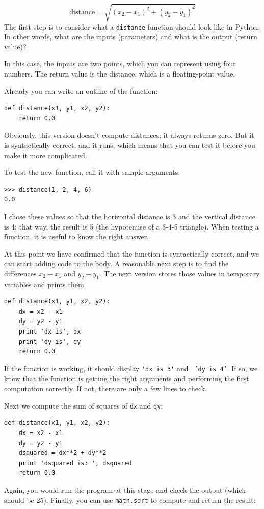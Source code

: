 \documentclass[10pt]{book}
\begin{document}
\begin{displaymath}
\mathrm{distance} = \sqrt{(x_2 - x_1)^2 + (y_2 - y_1)^2}
\end{displaymath}
%
The first step is to consider what a {\tt distance} function should
look like in Python.  In other words, what are the inputs (parameters)
and what is the output (return value)?

In this case, the inputs are two points, which you can represent
using four numbers.  The return value is the distance, which is
a floating-point value.

Already you can write an outline of the function:

\begin{verbatim}
def distance(x1, y1, x2, y2):
    return 0.0
\end{verbatim}
%
Obviously, this version doesn't compute distances; it always returns
zero.  But it is syntactically correct, and it runs, which means that
you can test it before you make it more complicated.

To test the new function, call it with sample arguments:

\begin{verbatim}
>>> distance(1, 2, 4, 6)
0.0
\end{verbatim}
%
I chose these values so that the horizontal distance is 3 and the
vertical distance is 4; that way, the result is 5
(the hypotenuse of a 3-4-5 triangle). When testing a function, it is
useful to know the right answer.

At this point we have confirmed that the function is syntactically
correct, and we can start adding code to the body.
A reasonable next step is to find the differences
$x_2 - x_1$ and $y_2 - y_1$.  The next version stores those values in
temporary variables and prints them.

\begin{verbatim}
def distance(x1, y1, x2, y2):
    dx = x2 - x1
    dy = y2 - y1
    print 'dx is', dx
    print 'dy is', dy
    return 0.0
\end{verbatim}
%
If the function is working, it should display \verb"'dx is 3'" and {\tt
'dy is 4'}.  If so, we know that the function is getting the right
arguments and performing the first computation correctly.  If not,
there are only a few lines to check.

Next we compute the sum of squares of {\tt dx} and {\tt dy}:

\begin{verbatim}
def distance(x1, y1, x2, y2):
    dx = x2 - x1
    dy = y2 - y1
    dsquared = dx**2 + dy**2
    print 'dsquared is: ', dsquared
    return 0.0
\end{verbatim}
%
Again, you would run the program at this stage and check the output
(which should be 25).
Finally, you can use {\tt math.sqrt} to compute and return the result:
\end{document}
